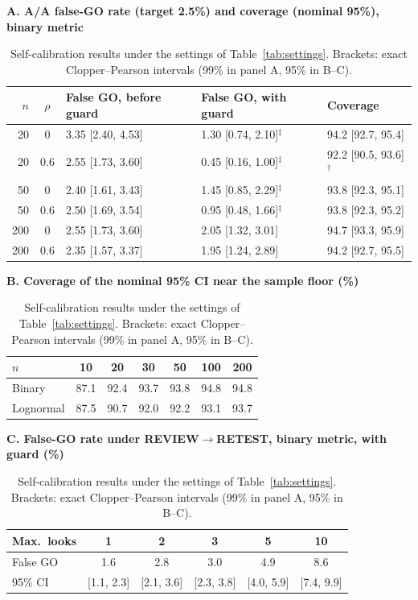 \begin{table}[t]
\centering
\caption{Self-calibration results under the settings of Table~\ref{tab:settings}.
Brackets: exact Clopper--Pearson intervals (99\% in panel A, 95\% in B--C).}
\label{tab:calibration}
\footnotesize
\setlength{\tabcolsep}{2.5pt}

\textbf{A. A/A false-GO rate (target 2.5\%) and coverage (nominal 95\%), binary metric}\\[1pt]
\begin{tabular}{@{}r c l l l@{}}
\toprule
$n$ & $\rho$ & False GO, before guard & False GO, with guard & Coverage \\
\midrule
20  & 0   & 3.35 [2.40, 4.53] & 1.30 [0.74, 2.10]$^\ddagger$ & 94.2 [92.7, 95.4] \\
20  & 0.6 & 2.55 [1.73, 3.60] & 0.45 [0.16, 1.00]$^\ddagger$ & 92.2 [90.5, 93.6]$^\dagger$ \\
50  & 0   & 2.40 [1.61, 3.43] & 1.45 [0.85, 2.29]$^\ddagger$ & 93.8 [92.3, 95.1] \\
50  & 0.6 & 2.50 [1.69, 3.54] & 0.95 [0.48, 1.66]$^\ddagger$ & 93.8 [92.3, 95.2] \\
200 & 0   & 2.55 [1.73, 3.60] & 2.05 [1.32, 3.01] & 94.7 [93.3, 95.9] \\
200 & 0.6 & 2.35 [1.57, 3.37] & 1.95 [1.24, 2.89] & 94.2 [92.7, 95.5] \\
\bottomrule
\end{tabular}

\vspace{4pt}
\textbf{B. Coverage of the nominal 95\% CI near the sample floor (\%)}\\[1pt]
\begin{tabular}{@{}l c c c c c c@{}}
\toprule
$n$ & 10 & 20 & 30 & 50 & 100 & 200 \\
\midrule
Binary    & 87.1 & 92.4 & 93.7 & 93.8 & 94.8 & 94.8 \\
Lognormal & 87.5 & 90.7 & 92.0 & 92.2 & 93.1 & 93.7 \\
\bottomrule
\end{tabular}

\vspace{4pt}
\textbf{C. False-GO rate under REVIEW$\to$RETEST, binary metric, with guard (\%)}\\[1pt]
\begin{tabular}{@{}l c c c c c@{}}
\toprule
Max.\ looks & 1 & 2 & 3 & 5 & 10 \\
\midrule
False GO & 1.6 & 2.8 & 3.0 & 4.9 & 8.6 \\
95\% CI  & [1.1, 2.3] & [2.1, 3.6] & [2.3, 3.8] & [4.0, 5.9] & [7.4, 9.9] \\
\bottomrule
\end{tabular}


\end{table}
